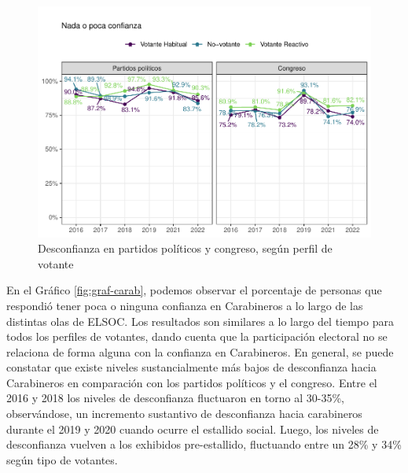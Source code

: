 \documentclass[
  12pt,
]{book}
\begin{document}
\begin{figure}

{\centering \includegraphics{reporte-elsoc_files/figure-latex/graf-conf-pol-2-2-1} 

}

\caption{Desconfianza en partidos políticos y congreso, según perfil de votante}\label{fig:graf-conf-pol-2-2}
\end{figure}

En el Gráfico \ref{fig:graf-carab}, podemos observar el porcentaje de personas que respondió tener poca o ninguna confianza en Carabineros a lo largo de las distintas olas de ELSOC. Los resultados son similares a lo largo del tiempo para todos los perfiles de votantes, dando cuenta que la participación electoral no se relaciona de forma alguna con la confianza en Carabineros. En general, se puede constatar que existe niveles sustancialmente más bajos de desconfianza hacia Carabineros en comparación con los partidos políticos y el congreso. Entre el 2016 y 2018 los niveles de desconfianza fluctuaron en torno al 30-35\%, observándose, un incremento sustantivo de desconfianza hacia carabineros durante el 2019 y 2020 cuando ocurre el estallido social. Luego, los niveles de desconfianza vuelven a los exhibidos pre-estallido, fluctuando entre un 28\% y 34\% según tipo de votantes.
\end{document}
